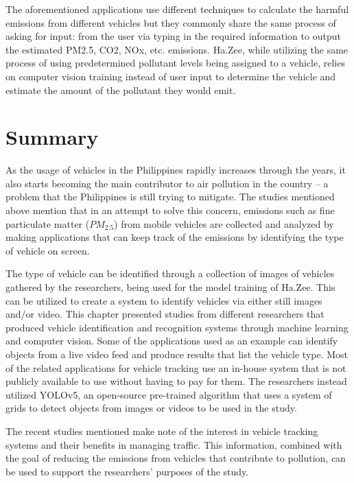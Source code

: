 	The aforementioned applications use different techniques to calculate the harmful emissions from different vehicles but they commonly share the same process of asking for input: from the user via typing in the required information to output the estimated PM2.5, CO2, NOx, etc. emissions. Ha.Zee, while utilizing the same process of using predetermined pollutant levels being assigned to a vehicle, relies on computer vision training instead of user input to determine the vehicle and estimate the amount of the pollutant they would emit.

\section{Summary}
 As the usage of vehicles in the Philippines rapidly increases through the years, it also starts becoming the main contributor to air pollution in the country – a problem that the Philippines is still trying to mitigate. The studies mentioned above mention that in an attempt to solve this concern, emissions such as fine particulate matter ($PM_{2.5}$) from mobile vehicles are collected and analyzed by making applications that can keep track of the emissions by identifying the type of vehicle on screen.

	The type of vehicle can be identified through a collection of images of vehicles gathered by the researchers, being used for the model training of Ha.Zee.  This can be utilized to create a system to identify vehicles via either still images and/or video. This chapter presented studies from different researchers that produced vehicle identification and recognition systems through machine learning and computer vision. Some of the applications used as an example can identify objects from a live video feed and produce results that list the vehicle type. Most of the related applications for vehicle tracking use an in-house system that is not publicly available to use without having to pay for them. The researchers instead utilized YOLOv5, an open-source pre-trained algorithm that uses a system of grids to detect objects from images or videos to be used in the study.
	

	The recent studies mentioned make note of the interest in vehicle tracking systems and their benefits in managing traffic. This information, combined with the goal of reducing the emissions from vehicles that contribute to pollution, can be used to support the researchers’ purposes of the study.



